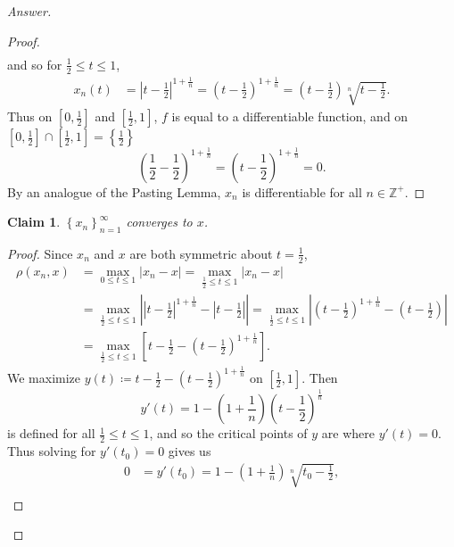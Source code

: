 \documentclass[12pt]{article}
\newcommand{\z}{\mathbb{Z}}
\newcommand\paren[1]{\left( #1 \right)}
\newcommand\setb[1]{\left \{ #1 \right \}}
\newcommand{\sqbrack}[1]{\left [ #1 \right ]}
\newtheorem*{claim}{Claim}
\theoremstyle{definition}
\begin{document}
\begin{proof}[Answer]
\begin{enumerate}[(a)]
\begin{proof}
\begin{align*}
            \end{align*}
            and so for $\frac{1}{2} \leq t \leq 1$,
            \begin{align*}
                x_n(t) & = \left| t - \frac{1}{2} \right|^{ 1 + \frac{1}{n} } = \paren{ t - \frac{1}{2} }^{ 1 + \frac{1}{n} } = \paren{ t - \frac{1}{2} } \sqrt[n]{ t - \frac{1}{2} }.
            \end{align*}
            Thus on $\sqbrack{0,\frac{1}{2}}$ and $\sqbrack{\frac{1}{2},1}$, $f$ is equal to a differentiable function, and on $\sqbrack{0,\frac{1}{2}} \cap \sqbrack{\frac{1}{2},1} = \setb{ \frac{1}{2} }$
            \[
                \paren{ \frac{1}{2} - \frac{1}{2} }^{ 1 + \frac{1}{n} } = \paren{ t - \frac{1}{2} }^{ 1 + \frac{1}{n} } = 0.
            \]
            By an analogue of the Pasting Lemma, $x_n$ is differentiable for all $n \in \z^+$.
        \end{proof}
        \begin{claim}
            $\setb{ x_n }_{n = 1}^{\infty}$ converges to $x$.
        \end{claim}
        \begin{proof}
            Since $x_n$ and $x$ are both symmetric about $t = \frac{1}{2}$, 
            \begin{align*}
                \rho \paren{ x_n , x } & = \max\limits_{0 \leq t \leq 1} \left| x_n - x \right| = \max\limits_{\frac{1}{2} \leq t \leq 1} \left| x_n - x \right| \\
                & = \max\limits_{\frac{1}{2} \leq t \leq 1} \left| \left| t - \frac{1}{2} \right|^{1+\frac{1}{n}} - \left| t - \frac{1}{2} \right| \right| = \max\limits_{\frac{1}{2} \leq t \leq 1} \left| \paren{ t - \frac{1}{2} }^{1+\frac{1}{n}} - \paren{ t - \frac{1}{2} } \right| \\
                & = \max\limits_{\frac{1}{2} \leq t \leq 1} \sqbrack{ t - \frac{1}{2} - \paren{ t - \frac{1}{2} }^{1+\frac{1}{n}} }. 
            \end{align*}
            We maximize $y(t) \coloneqq t - \frac{1}{2} - \paren{ t - \frac{1}{2} }^{1+\frac{1}{n}}$ on $\sqbrack{ \frac{1}{2} , 1 }$. Then 
            \[
                y'(t) = 1 - \paren{ 1 + \frac{1}{n} } \paren{ t - \frac{1}{2} }^{ \frac{1}{n} }
            \]
            is defined for all $\frac{1}{2} \leq t \leq 1$, and so the critical points of $y$ are where $y'(t) = 0$. Thus solving for $y'(t_0) = 0$ gives us
            \begin{align*}
                0 & = y'(t_0) = 1 - \paren{ 1 + \frac{1}{n} } \sqrt[n]{ t_0 - \frac{1}{2} } , \\

\end{align*}
\end{proof}
\end{enumerate}
\end{proof}
\end{document}

